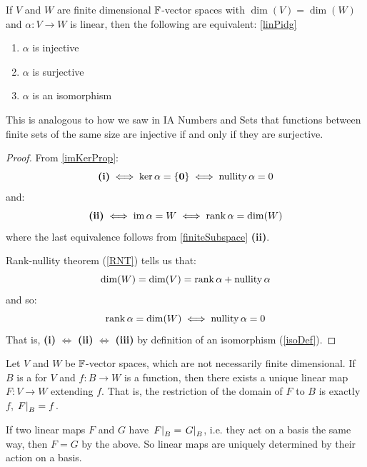 \documentclass[../main.tex]{subfiles}
\begin{document}
\begin{corollary}
  If $V$ and $W$ are finite dimensional $\mathbb{F}$-vector spaces with $\dim(V) = \dim(W)$ and $\alpha: V \to W$ is linear, then the following are equivalent: \cref{linPidg}
  \begin{enumerate}
    \item $\alpha$ is injective
    \item $\alpha$ is surjective
    \item $\alpha$ is an isomorphism
  \end{enumerate}
\end{corollary}
\begin{remark}[Intuition]
  This is analogous to how we saw in IA Numbers and Sets that functions between finite sets of the same size are injective if and only if they are surjective.
\end{remark}
\begin{proof}
  From \cref{imKerProp}:
  \[
    \textbf{(i)} \iff \ker \alpha = \{\mathbf{\bm{0}}\} \iff \operatorname{nullity} \alpha = 0
  \]
  and:
  \[
    \textbf{(ii)} \iff \operatorname{im} \alpha = W \iff \operatorname{rank} \alpha = \dim(W)
  \]
  where the last equivalence follows from \cref{finiteSubspace} \textbf{(ii)}.

  Rank-nullity theorem (\cref{RNT}) tells us that:
  \[
    \dim(W) = \dim(V) = \operatorname{rank} \alpha + \operatorname{nullity} \alpha
  \]
  and so:
  \[
    \operatorname{rank} \alpha = \dim(W) \iff \operatorname{nullity} \alpha = 0
  \]
  That is, \textbf{(i)} $\iff$ \textbf{(ii)} $\iff$ \textbf{(iii)} by definition of an isomorphism (\cref{isoDef}).
\end{proof}
\begin{proposition}
  Let $V$ and $W$ be $\mathbb{F}$-vector spaces, which are not necessarily finite dimensional.
  If $B$ is a for $V$ and $f: B \to W$ is a function, then there exists a unique linear map $F: V \to W$ extending $f$.
  That is, the restriction of the domain of $F$ to $B$ is exactly $f$, $\left. F \right|_{B} = f$. \label{linMapBasis}
\end{proposition}
\begin{remark}[Intuition]
  If two linear maps $F$ and $G$ have $\left. F \right|_{B} = \left. G \right|_{B}$, i.e. they act on a basis the same way, then $F = G$ by the above.
  So linear maps are uniquely determined by their action on a basis.
\end{remark}
\end{document}
